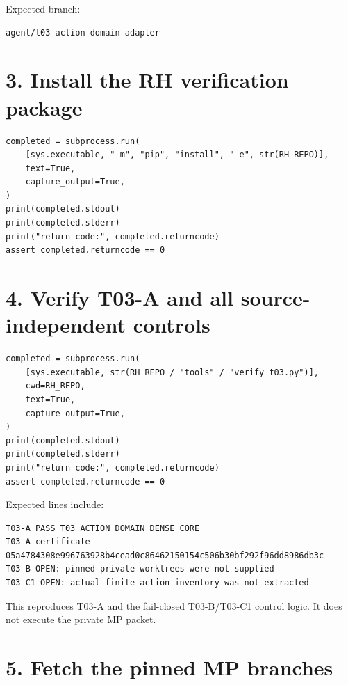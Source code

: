 Expected branch:

\begin{verbatim}
agent/t03-action-domain-adapter
\end{verbatim}

\hypertarget{install-the-rh-verification-package}{%
\section{3. Install the RH verification package}\label{install-the-rh-verification-package}}

\begin{verbatim}
completed = subprocess.run(
    [sys.executable, "-m", "pip", "install", "-e", str(RH_REPO)],
    text=True,
    capture_output=True,
)
print(completed.stdout)
print(completed.stderr)
print("return code:", completed.returncode)
assert completed.returncode == 0
\end{verbatim}

\hypertarget{verify-t03-a-and-all-source-independent-controls}{%
\section{4. Verify T03-A and all source-independent controls}\label{verify-t03-a-and-all-source-independent-controls}}

\begin{verbatim}
completed = subprocess.run(
    [sys.executable, str(RH_REPO / "tools" / "verify_t03.py")],
    cwd=RH_REPO,
    text=True,
    capture_output=True,
)
print(completed.stdout)
print(completed.stderr)
print("return code:", completed.returncode)
assert completed.returncode == 0
\end{verbatim}

Expected lines include:

\begin{verbatim}
T03-A PASS_T03_ACTION_DOMAIN_DENSE_CORE
T03-A certificate 05a4784308e996763928b4cead0c86462150154c506b30bf292f96dd8986db3c
T03-B OPEN: pinned private worktrees were not supplied
T03-C1 OPEN: actual finite action inventory was not extracted
\end{verbatim}

This reproduces T03-A and the fail-closed T03-B/T03-C1 control logic. It does not
execute the private MP packet.

\hypertarget{fetch-the-pinned-mp-branches}{%
\section{5. Fetch the pinned MP branches}\label{fetch-the-pinned-mp-branches}}


